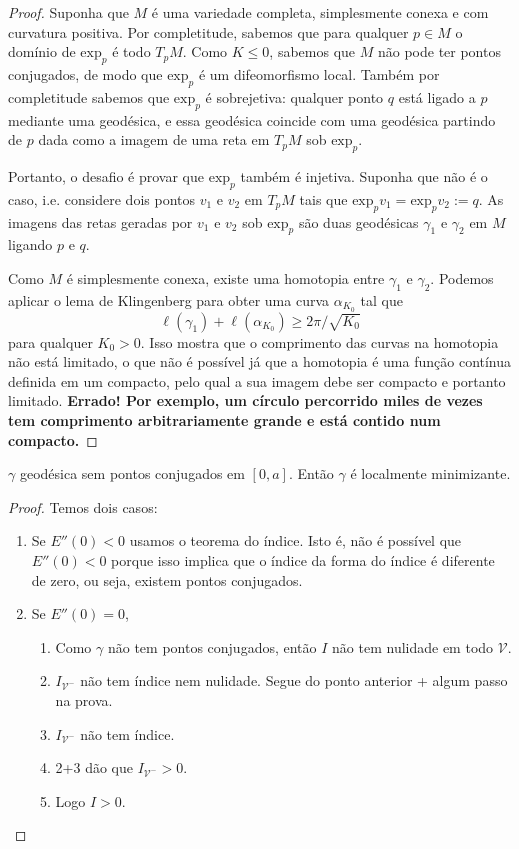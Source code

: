 \begin{proof}
Suponha que $M$ é uma variedade completa,
simplesmente conexa e com curvatura
positiva. Por completitude, sabemos que para
qualquer $p \in M$ o domínio de
$\text{exp}_p$ é todo $T_pM$. Como $K\leq 0$,
sabemos que $M$
não pode ter pontos conjugados, de modo que
$\text{exp}_p$ é um
difeomorfismo local. Também por completitude
sabemos que
$\text{exp}_p$ é sobrejetiva: qualquer ponto
$q$ está ligado a $p$
mediante uma geodésica, e essa geodésica
coincide com uma geodésica partindo de
$p$ dada como a imagem de uma reta em $T_pM$
sob $\text{exp}_p$.

Portanto, o desafio é provar que
$\text{exp}_p$ também é injetiva.
Suponha que não é o caso, i.e. considere dois
pontos $v_1$ e $v_2$ em
$T_pM$ tais que
$\text{exp}_pv_1=\text{exp}_pv_2:=q$. As
imagens das retas geradas por $v_1$ e $v_2$
sob $\text{exp}_p$ são
duas geodésicas $\gamma_1$ e $\gamma_2$ em
$M$ ligando $p$ e $q$.

Como $M$ é simplesmente conexa, existe uma
homotopia entre $\gamma_1$ e
$\gamma_2$. Podemos aplicar o lema de
Klingenberg para obter uma curva
$\alpha_{K_0}$ tal que $$
\ell(\gamma_1)+\ell(\alpha_{K_0}) \geq
2\pi/\sqrt{K_0} $$ para qualquer $K_0>0$.
Isso mostra que o comprimento das
curvas na homotopia não está limitado, o que
não é possível já que a homotopia é
uma função contínua definida em um compacto,
pelo qual a sua imagem debe ser
compacto e portanto limitado. {\bf Errado!
Por exemplo, um círculo percorrido
miles de vezes tem comprimento
arbitrariamente grande e está contido num
compacto.}
\end{proof}

\begin{exercise}
\label{exercise-geode-sem-ponto-conju-e}
$\gamma$ geodésica sem pontos conjugados em
$[0,a]$. Então $\gamma$ é localmente
minimizante.
\end{exercise}

\begin{proof}
Temos dois casos:
\begin{enumerate}
\item Se $E''(0)<0$ usamos o teorema do
índice. Isto é, não é possível que
 $E''(0)<0$ porque isso implica que o índice
 da forma do índice é diferente
 de zero, ou seja, existem pontos conjugados.
\item Se $E''(0)=0$,
\begin{enumerate}
\item[(0)] Como $\gamma$ não tem pontos
conjugados, então $I$ não tem
nulidade em todo  $\mathcal{V}$.
\item $I_{\mathcal{V}^-}$ não tem índice nem
nulidade. Segue do ponto anterior +
algum passo na prova.
\item $I_{\mathcal{V}^-}$ não tem índice.
\item 2+3 dão que $I_{\mathcal{V}^-}>0$.
\item Logo $I>0$.
\end{enumerate}
\end{enumerate}
\end{proof}

